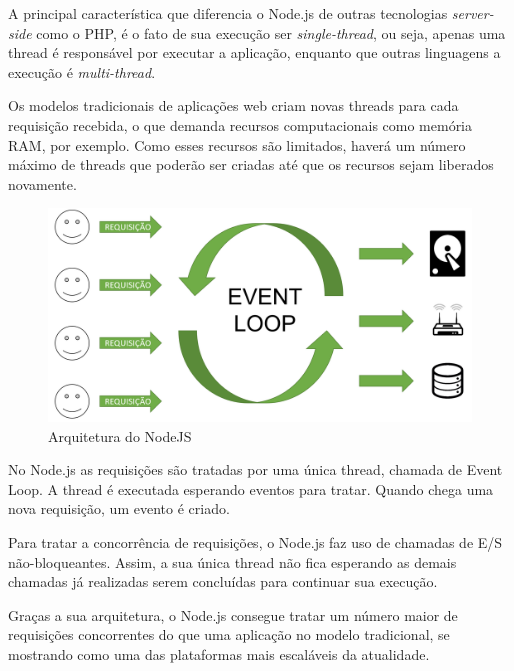   
  A principal característica que diferencia o Node.js de outras tecnologias \emph{server-side} como o PHP, é o fato de sua execução ser \emph{single-thread}, ou seja, apenas uma thread é responsável por executar a aplicação, enquanto que outras linguagens a execução é \emph{multi-thread}.
  
  Os modelos tradicionais de aplicações web criam novas threads para cada requisição recebida, o que demanda recursos computacionais como memória RAM, por exemplo. Como esses recursos são limitados, haverá um número máximo de threads que poderão ser criadas até que os recursos sejam liberados novamente.
  
  \begin{figure}[h!]
  	\begin{center}
  		\includegraphics[width=1\linewidth]{images/node_thread.png}
  		\caption{Arquitetura do NodeJS}
  		\label{fig:node}
  	\end{center}
  \end{figure}
    
  No Node.js as requisições são tratadas por uma única thread, chamada de Event Loop. A thread é executada esperando eventos para tratar. Quando chega uma nova requisição, um evento é criado.
  
  Para tratar a concorrência de requisições, o Node.js faz uso de chamadas de E/S não-bloqueantes. Assim, a sua única thread não fica esperando as demais chamadas já realizadas serem concluídas para continuar sua execução.
  
  Graças a sua arquitetura, o Node.js consegue tratar um número maior de requisições concorrentes do que uma aplicação no modelo tradicional, se mostrando como uma das plataformas mais escaláveis da atualidade.
  

